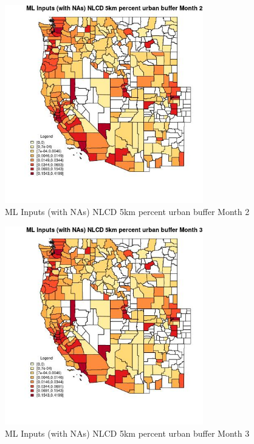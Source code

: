 \begin{figure} 
\centering  
\includegraphics[width=0.77\textwidth]{Code_Outputs/Report_ML_input_PM25_Step4_part_f_de_duplicated_aveswNAs_CountyNLCD_5km_percent_urban_buffermedianMonth2.jpg} 
\caption{\label{fig:Report_ML_input_PM25_Step4_part_f_de_duplicated_aveswNAsCountyNLCD_5km_percent_urban_buffermedianMonth2}ML Inputs (with NAs) NLCD 5km percent urban buffer Month 2} 
\end{figure} 
 

\begin{figure} 
\centering  
\includegraphics[width=0.77\textwidth]{Code_Outputs/Report_ML_input_PM25_Step4_part_f_de_duplicated_aveswNAs_CountyNLCD_5km_percent_urban_buffermedianMonth3.jpg} 
\caption{\label{fig:Report_ML_input_PM25_Step4_part_f_de_duplicated_aveswNAsCountyNLCD_5km_percent_urban_buffermedianMonth3}ML Inputs (with NAs) NLCD 5km percent urban buffer Month 3} 
\end{figure} 
 

